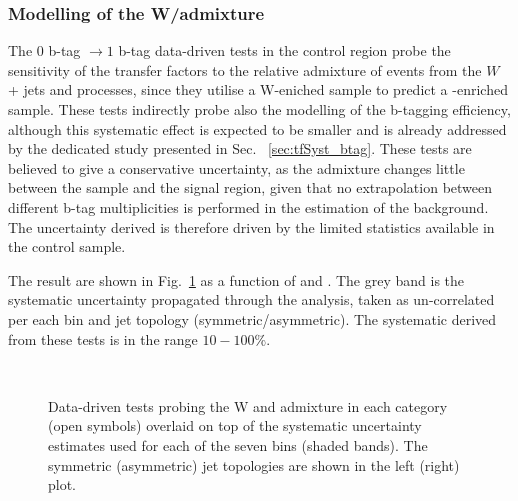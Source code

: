 \subsubsection*{Modelling of the W/\ttbar admixture}
\label{sec:tfSyst_WttAd}
The $0$ b-tag $\rightarrow1$ b-tag data-driven tests in the \mj control region 
probe the sensitivity of the transfer factors to the relative
admixture of events from the $W$ + jets and \ttbar processes, 
since they utilise a W-eniched sample to predict a \ttbar-enriched sample. 
These tests indirectly probe also the modelling of the b-tagging efficiency, 
although this systematic effect is expected to be smaller and is already addressed 
by the dedicated study presented in Sec. ~\ref{sec:tfSyst_btag}.
These tests are believed to give a conservative uncertainty, 
as the admixture changes little between the \mj sample and the signal region, 
given that no extrapolation between different b-tag multiplicities is performed 
in the estimation of the background. 
The uncertainty derived is therefore driven by the limited statistics available in the control sample. 

The result are shown in Fig.~\ref{fig:closureBTag} as a function of \scalht and \njet. 
The grey band is the systematic uncertainty propagated through the analysis, 
taken as un-correlated per each \scalht bin and jet topology (symmetric/asymmetric). The systematic derived from these tests is
in the range $10-100\%$.

\begin{figure}[h!]
  \begin{center}
    ~~
    \caption{Data-driven tests probing the W and \ttbar admixture 
      in each \njet category (open symbols) overlaid on top of the systematic
      uncertainty estimates used for each of the seven \scalht bins
      (shaded bands). 
      The symmetric (asymmetric) jet topologies are shown in the left (right) plot.      
    }
    \label{fig:closureBTag}
  \end{center} 
\end{figure}


